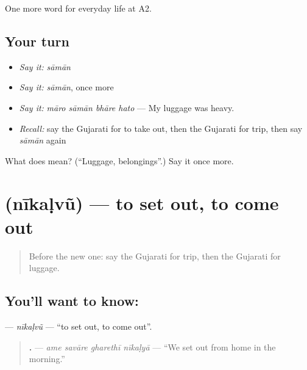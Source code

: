 \begin{grammarlens}[title={What you've built}]
One more word for everyday life at A2.
\end{grammarlens}

\subsection*{Your turn}
\begin{itemize}
\raggedright
  \item \emph{Say it:} \emph{sāmān}
  \item \emph{Say it:} \emph{sāmān}, once more
  \item \emph{Say it:} \emph{māro sāmān bhāre hato} — My luggage was heavy.
  \item \emph{Recall:} say the Gujarati for to take out, then the Gujarati for trip, then say \emph{sāmān} again
\end{itemize}

\begin{tcolorbox}[breakable,colback=teal!4,colframe=teal!35!black,title={Before you move on}]
What does  mean? (\textquotedblleft{}Luggage, belongings\textquotedblright{}.) Say it once more.
\end{tcolorbox}
\section[\texorpdfstring{\gu{નીકળવું} (nīkaḷvũ)}{નીકળવું (nīkaḷvũ)}]{ (nīkaḷvũ) — to set out, to come out}

\label{lesson:GU-C203-nikalvu}



\begin{quote}
Before the new one: say the Gujarati for trip, then the Gujarati for luggage.
\end{quote}

\subsection*{You'll want to know: }
\textbf{} — \emph{nīkaḷvũ} — \textquotedblleft{}to set out, to come out\textquotedblright{}.

\begin{quote}
\textbf{   .} — \emph{ame savāre gharethī nīkaḷyā} — \textquotedblleft{}We set out from home in the morning.\textquotedblright{}
\end{quote}


